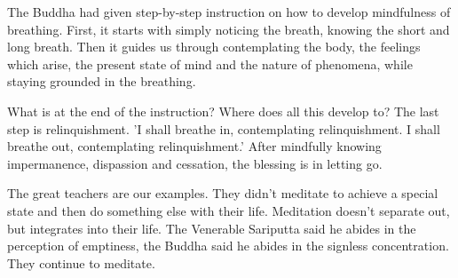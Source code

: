 The Buddha had given step-by-step instruction on how to develop
mindfulness of breathing. First, it starts with simply noticing the
breath, knowing the short and long breath. Then it guides us through
contemplating the body, the feelings which arise, the present state of
mind and the nature of phenomena, while staying grounded in the
breathing.

What is at the end of the instruction? Where does all this develop to?
The last step is relinquishment. 'I shall breathe in, contemplating
relinquishment. I shall breathe out, contemplating relinquishment.'
After mindfully knowing impermanence, dispassion and cessation, the
blessing is in letting go.

The great teachers are our examples. They didn't meditate to achieve a
special state and then do something else with their life. Meditation
doesn't separate out, but integrates into their life. The Venerable
Sariputta said he abides in the perception of emptiness, the Buddha said
he abides in the signless concentration. They continue to meditate.
